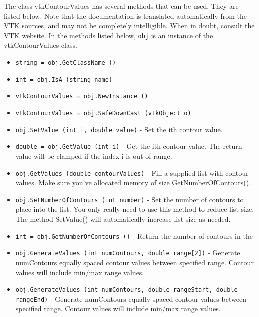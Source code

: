 The class vtkContourValues has several methods that can be used.
  They are listed below.
Note that the documentation is translated automatically from the VTK sources,
and may not be completely intelligible.  When in doubt, consult the VTK website.
In the methods listed below, \verb|obj| is an instance of the vtkContourValues class.
\begin{itemize}
\item  \verb|string = obj.GetClassName ()|

\item  \verb|int = obj.IsA (string name)|

\item  \verb|vtkContourValues = obj.NewInstance ()|

\item  \verb|vtkContourValues = obj.SafeDownCast (vtkObject o)|

\item  \verb|obj.SetValue (int i, double value)| -  Set the ith contour value.

\item  \verb|double = obj.GetValue (int i)| -  Get the ith contour value. The return value will be clamped if the
 index i is out of range.

\item  \verb|obj.GetValues (double contourValues)| -  Fill a supplied list with contour values. Make sure you've
 allocated memory of size GetNumberOfContours().

\item  \verb|obj.SetNumberOfContours (int number)| -  Set the number of contours to place into the list. You only really
 need to use this method to reduce list size. The method SetValue()
 will automatically increase list size as needed.

\item  \verb|int = obj.GetNumberOfContours ()| -  Return the number of contours in the

\item  \verb|obj.GenerateValues (int numContours, double range[2])| -  Generate numContours equally spaced contour values between specified
 range. Contour values will include min/max range values.

\item  \verb|obj.GenerateValues (int numContours, double rangeStart, double rangeEnd)| -  Generate numContours equally spaced contour values between specified
 range. Contour values will include min/max range values.

\end{itemize}
